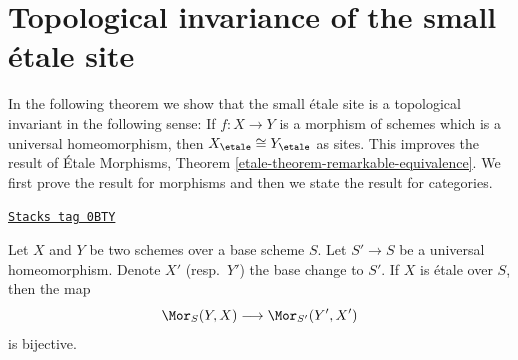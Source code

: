 \section{Topological invariance of the small \'etale site}
\label{etale-cohomology-section-topological-invariance}
In the following theorem we show that the small \'etale site is a topological
invariant in the following sense: If $f : X \to Y$ is a morphism of schemes
which is a universal homeomorphism, then $X_\etale \cong Y_\etale$
as sites. This improves the result of
\'Etale Morphisms, Theorem \ref{etale-theorem-remarkable-equivalence}.
We first prove the result for morphisms and then we state the result
for categories.

\begin{theorem}
\label{etale-cohomology-theorem-etale-topological}
\href{https://stacks.math.columbia.edu/tag/0BTY}{\texttt{Stacks tag 0BTY}}

Let $X$ and $Y$ be two schemes over a base scheme $S$. Let
$S' \to S$ be a universal homeomorphism.
Denote $X'$ (resp.\ $Y'$) the base change to $S'$.
If $X$ is \'etale over $S$, then the map
$$
\Mor_S(Y, X) \longrightarrow \Mor_{S'}(Y', X')
$$
is bijective.
\end{theorem}

